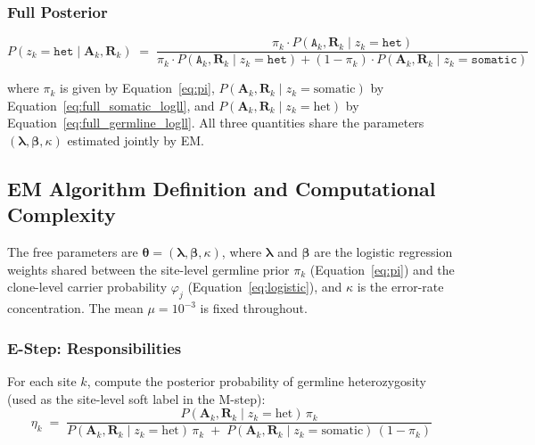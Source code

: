 \documentclass{article}
\begin{document}
\subsubsection*{Full Posterior}

\begin{equation}
  P\!\left(z_k = \texttt{het} \mid \mathbf{A}_k, \mathbf{R}_k\right)
  \;=\;
  \frac{
    \pi_k \cdot P\left(\texttt{A}_k, \mathbf{R}_k \mid z_k = \texttt{het}\right)
  }{
    \pi_k \cdot P\left(\texttt{A}_k, \mathbf{R}_k \mid z_k = \texttt{het}\right)
    + (1 - \pi_k)\cdot P\left(\mathbf{A}_k, \mathbf{R}_k \mid z_k = \texttt{somatic}\right)
  }
\label{eq:posterior}
\end{equation}

where $\pi_k$ is given by Equation~\eqref{eq:pi}, $P(\mathbf{A}_k, \mathbf{R}_k \mid z_k = \mathrm{somatic})$ by
Equation~\eqref{eq:full_somatic_logll}, and $P(\mathbf{A}_k, \mathbf{R}_k \mid z_k =
\mathrm{het})$ by Equation~\eqref{eq:full_germline_logll}.  All three quantities share the parameters $(\boldsymbol{\lambda}, \boldsymbol{\beta}, \kappa)$ estimated jointly by EM.


\subsection*{EM Algorithm Definition and Computational Complexity}

The free parameters are $\boldsymbol{\theta} = (\boldsymbol{\lambda},
\boldsymbol{\beta}, \kappa)$, where $\boldsymbol{\lambda}$ and
$\boldsymbol{\beta}$ are the logistic regression weights shared between the
site-level germline prior $\pi_k$ (Equation~\ref{eq:pi}) and the clone-level
carrier probability $\varphi_j$ (Equation~\ref{eq:logistic}), and $\kappa$ is
the error-rate concentration.  The mean $\mu = 10^{-3}$ is fixed throughout.

\subsubsection*{E-Step: Responsibilities}

For each site $k$, compute the posterior probability of germline heterozygosity
(used as the site-level soft label in the M-step):
\begin{equation}
  \eta_k
  \;=\;
  \frac{
    P\!\left(\mathbf{A}_k, \mathbf{R}_k \mid z_k = \mathrm{het}\right)\,\pi_k
  }{
    P\!\left(\mathbf{A}_k, \mathbf{R}_k \mid z_k = \mathrm{het}\right)\,\pi_k
    \;+\;
    P\!\left(\mathbf{A}_k, \mathbf{R}_k \mid z_k = \mathrm{somatic}\right)\,(1-\pi_k)
  }
\end{equation}
\end{document}
